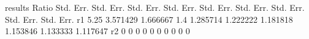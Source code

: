 	results									
	Ratio	Std. Err.	Std. Err.	Std. Err.	Std. Err.	Std. Err.	Std. Err.	Std. Err.	Std. Err.	Std. Err.
r1	5.25	3.571429	1.666667	1.4	1.285714	1.222222	1.181818	1.153846	1.133333	1.117647
r2	0	0	0	0	0	0	0	0	0	0
